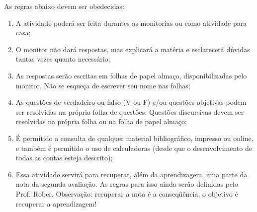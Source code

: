 \documentclass[pdftex, brazil, 12pt, oneside, addpoints]{exam}
\begin{document}
As regras abaixo devem ser obedecidas:

\begin{enumerate}
  \item A atividade poderá ser feita durantes as monitorias ou
        como atividade para casa;
  \item O monitor não dará respostas, mas explicará a matéria e
        esclarecerá dúvidas tantas vezes quanto necessário;
  \item As respostas serão escritas em folhas de papel almaço,
        disponibilizadas pelo monitor. Não se esqueça de escrever seu
        nome nas folhas;
  \item As questões de verdadeiro ou falso (V ou F) e/ou questões
        objetivas podem ser resolvidas na própria folha de
        questões. Questões discursivas devem ser resolvidas na própria
        folha ou na folha de papel almaço;
  \item É permitido a consulta de qualquer material bibliográfico,
        impresso ou online, e também é permitido o uso de calculadoras
        (desde que o desenvolvimento de todas as contas esteja
        descrito);
  \item Essa atividade servirá para recuperar, além da aprendizagem,
        uma parte da nota da segunda avaliação. As regras para isso
        ainda serão definidas pelo Prof. Rober. Observação: recuperar
        a nota é a conseqüência, o objetivo é recuperar a aprendizagem!
\end{enumerate}
\end{document}
